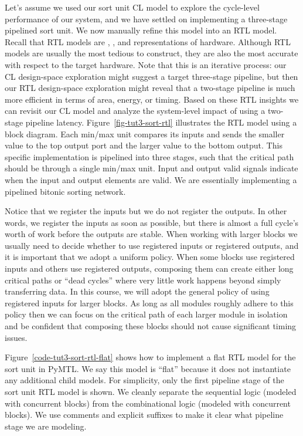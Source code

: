 \documentclass{cbxdoc}
\begin{document}
Let's assume we used our sort unit CL model to explore the cycle-level
performance of our system, and we have settled on implementing a
three-stage pipelined sort unit. We now manually refine this model into
an RTL model. Recall that RTL models are ,
, and  representations of
hardware. Although RTL models are usually the most tedious to construct,
they are also the most accurate with respect to the target hardware. Note
that this is an iterative process: our CL design-space exploration might
suggest a target three-stage pipeline, but then our RTL design-space
exploration might reveal that a two-stage pipeline is much more efficient
in terms of area, energy, or timing. Based on these RTL insights we can
revisit our CL model and analyze the system-level impact of using a
two-stage pipeline latency. Figure~\ref{fig-tut3-sort-rtl} illustrates
the RTL model using a block diagram. Each min/max unit compares its
inputs and sends the smaller value to the top output port and the larger
value to the bottom output. This specific implementation is pipelined
into three stages, such that the critical path should be through a single
min/max unit. Input and output valid signals indicate when the input and
output elements are valid. We are essentially implementing a pipelined
bitonic sorting network.



Notice that we register the inputs but we do not register the outputs. In
other words, we register the inputs as soon as possible, but there is
almost a full cycle's worth of work before the outputs are stable. When
working with larger blocks we usually need to decide whether to use
registered inputs or registered outputs, and it is important that we
adopt a uniform policy. When some blocks use registered inputs and others
use registered outputs, composing them can create either long critical
paths or ``dead cycles'' where very little work happens beyond simply
transferring data. In this course, we will adopt the general policy of
using registered inputs for larger blocks. As long as all modules roughly
adhere to this policy then we can focus on the critical path of each
larger module in isolation and be confident that composing these blocks
should not cause significant timing issues.



Figure~\ref{code-tut3-sort-rtl-flat} shows how to implement a flat RTL
model for the sort unit in PyMTL. We say this model is ``flat'' because
it does not instantiate any additional child models. For simplicity, only
the first pipeline stage of the sort unit RTL model is shown. We cleanly
separate the sequential logic (modeled with  concurrent
blocks) from the combinational logic (modeled with 
concurrent blocks). We use comments and explicit suffixes to make it
clear what pipeline stage we are modeling.
\end{document}
